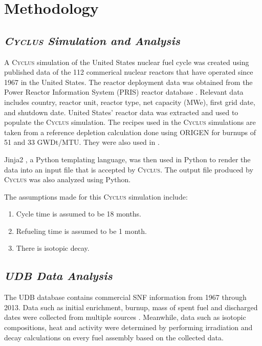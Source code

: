 \documentclass{anstrans}
\newcommand{\Cyclus}{\textsc{Cyclus}\xspace}%
\begin{document}
\section{Methodology}
\subsection{\textit{\Cyclus Simulation and Analysis}}
A \Cyclus simulation of the United States nuclear fuel cycle was created using 
published data of the 112 commerical nuclear reactors that have operated since 
1967 in the United States. The reactor deployment data was obtained from the 
Power Reactor Information System (PRIS) reactor database \cite{IAEA_pris_2017}. 
Relevant data includes country, reactor unit, reactor type, net capacity (MWe), 
first grid date, and shutdown date. United States' reactor data was extracted 
and used to populate the \Cyclus simulation. The recipes used in the \Cyclus 
simulations are taken from a reference depletion calculation done using ORIGEN 
\cite{bell_origen_1973} for burnups of 51 and 33 GWDt/MTU. They were also used 
in \cite{wilson_adoption_2009, bae_synergistic_2017}. 

Jinja2 \cite{ronacher_welcome_2018}, a Python templating language, was then 
used in Python to render the data into an input file that is accepted by 
\Cyclus. The output file produced by \Cyclus was also analyzed using Python. 

The assumptions made for this \Cyclus simulation include: 

\begin{enumerate}
	\item Cycle time is assumed to be 18 months. 
	\item Refueling time is assumed to be 1 month. 
	\item There is isotopic decay. 
\end{enumerate}

\subsection{\textit{UDB Data Analysis}}
The UDB database contains commercial SNF information from 1967 through 2013. 
Data such as initial enrichment, burnup, mass of spent fuel and discharged 
dates were collected from multiple sources \cite{peterson_additional_2017}. 
Meanwhile, data such as isotopic compositions, heat and activity were determined 
by performing irradiation and decay calculations on every fuel assembly based 
on the collected data. 
\end{document}
